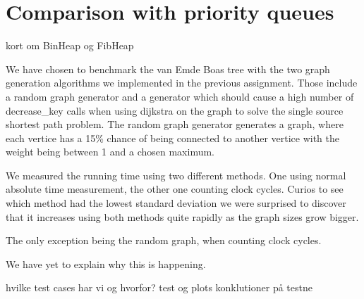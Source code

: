 \section*{Comparison with priority queues}
kort om BinHeap og FibHeap

We have chosen to benchmark the van Emde Boas tree with the two graph generation algorithms we implemented in the previous assignment.
Those include a random graph generator and a generator which should cause a high number of decrease\_key calls when using dijkstra on the graph to solve the single source shortest path problem.
The random graph generator generates a graph, where each vertice has a 15\% chance of being connected to another vertice with the weight being between 1 and a chosen maximum.







We measured the running time using two different methods. One using normal absolute time measurement, the other one counting clock cycles. Curios to see which method had the lowest standard deviation we were surprised to discover that it increases using both methods quite rapidly as the graph sizes grow bigger.



The only exception being the random graph, when counting clock cycles.



We have yet to explain why this is happening.

hvilke test cases har vi og hvorfor?
test og plots
konklutioner på testne